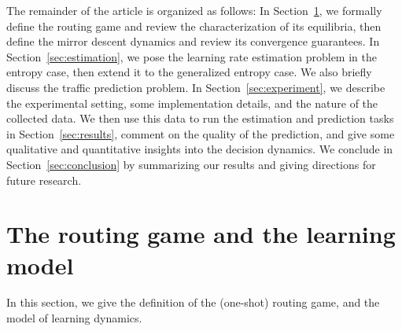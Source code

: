 \documentclass{sig-alternate-ipsn13}
\begin{document}
The remainder of the article is organized as follows: In Section~\ref{sec:model}, we formally define the routing game and review the characterization of its equilibria, then define the mirror descent dynamics and review its convergence guarantees. In Section~\ref{sec:estimation}, we pose the learning rate estimation problem in the entropy case, then extend it to the generalized entropy case. We also briefly discuss the traffic prediction problem. In Section~\ref{sec:experiment}, we describe the experimental setting, some implementation details, and the nature of the collected data. We then use this data to run the estimation and prediction tasks in Section~\ref{sec:results}, comment on the quality of the prediction, and give some qualitative and quantitative insights into the decision dynamics. We conclude in Section~\ref{sec:conclusion} by summarizing our results and giving directions for future research.

\section{The routing game and the learning model}
\label{sec:model}
In this section, we give the definition of the (one-shot) routing game, and the model of learning dynamics.
\end{document}
